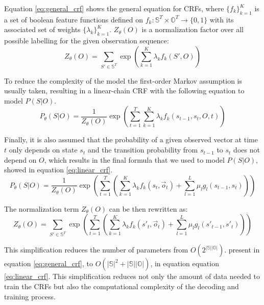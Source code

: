 \documentclass[10pt,a4paper]{article}
\begin{document}
Equation \ref{eq:general_crf} shows the general equation for CRFs, where $\{f_k\}_{k=1}^K$ is a set of boolean feature functions defined on $f_k : \mathbb{S}^T \times \mathbb{O}^T \rightarrow \{0,1\}$ with its associated set of weights $\{\lambda_k\}_{k=1}^K$. $Z_\theta(O)$ is a normalization factor over all possible labelling for the given observation sequence:\\

\begin{equation}
Z_\theta(O) = \sum_{S' \in \mathbb{S}^T} \exp \left( \sum_{k=1}^K \lambda_k f_k(S',O) \right)
\end{equation}

To reduce the complexity of the model the first-order Markov assumption is usually taken, resulting in a linear-chain CRF with the following equation to model $P(S|O)$.\\

\begin{equation}
P_\theta(S|O) = \frac{1}{Z_\theta(O)} \exp \left( \sum_{t=1}^T \sum_{k=1}^K \lambda_k f_k(s_{t-1},s_t,O,t) \right)
\end{equation}

Finally, it is also assumed that the probability of a given observed vector at time $t$ only depends on state $s_t$ and the transition probability from $s_{t-1}$ to $s_t$ does not depend on $O$, which results in the final formula that we used to model $P(S|O)$, showed in equation \ref{eq:linear_crf}.\\

\begin{equation}\label{eq:linear_crf}
P_\theta(S|O) = \frac{1}{Z_\theta(O)} \exp \left( \sum_{t=1}^T \left( \sum_{k=1}^K \lambda_k f_k(s_t, \vec{o}_t) + \sum_{l=1}^L \mu_l g_l(s_{t-1}, s_t)\right) \right)
\end{equation}

The normalization term $Z_\theta(O)$ can be then rewritten as:\\
\begin{equation}\label{eq:Z_linear_crf}
Z_\theta(O) = \sum_{S' \in \mathbb{S}^T} \exp \left( \sum_{t=1}^T \left( \sum_{k=1}^K \lambda_k f_k(s'_t, \vec{o}_t) + \sum_{l=1}^L \mu_l g_l(s'_{t-1}, s'_t)\right) \right)
\end{equation}

This simplification reduces the number of parameters from $O(2^{|\mathbb{S}| |\mathbb{O}|})$. present in equation \ref{eq:general_crf}, to $O(|\mathbb{S}|^2 + |\mathbb{S}||\mathbb{O}|)$, in equation equation \ref{eq:linear_crf}. This simplification reduces not only the amount of data needed to train the CRFs but also the computational complexity of the decoding and training process.\\
\end{document}
